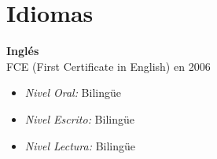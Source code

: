 \section{Idiomas}

\begin{large}
\textbf{Inglés}\\


FCE (First Certificate in English) en 2006
\end{large}
\begin{itemize}
\item \textit{Nivel Oral:} Bilingüe
\item \textit{Nivel Escrito:} Bilingüe
\item \textit{Nivel Lectura:} Bilingüe
\end{itemize}
